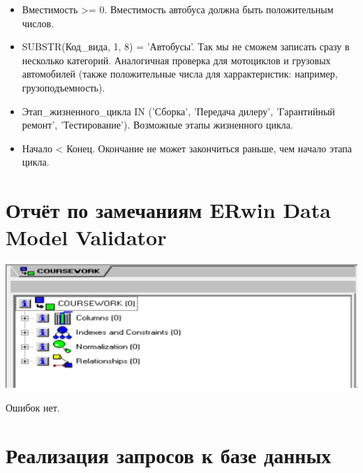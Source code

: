 \begin{itemize}
    \item Вместимость >= 0.
    Вместимость автобуса должна быть положительным числов.

    \item SUBSTR(Код\_вида, 1, 8) = 'Автобусы'.
    Так мы не сможем записать сразу в несколько категорий.
    Аналогичная проверка для мотоциклов и грузовых автомобилей (также положительные числа для харрактеристик: например, грузоподъемность).

    \item Этап\_жизненного\_цикла IN ('Сборка', 'Передача дилеру', 'Гарантийный ремонт', 'Тестирование').
    Возможные этапы жизненного цикла.

    \item Начало < Конец.
    Окончание не может закончиться раньше, чем начало этапа цикла.

\end{itemize}

\section {Отчёт по замечаниям ERwin Data Model Validator}

\includegraphics[width=17cm]{./screenshots/validator/validator.png}

Ошибок нет.

\section{Реализация запросов к базе данных}

